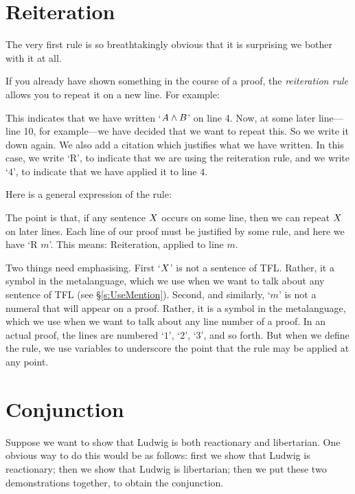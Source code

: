 \section{Reiteration}\label{s:Reiteration}
The very first rule is so breathtakingly obvious that it is surprising we bother with it at all. 

If you already have shown something in the course of a proof, the \emph{reiteration rule} allows you to repeat it on a new line. For example:
\begin{pf}
	\have[$\vdots$]{}{\vdots}
	 
\end{pf}
This indicates that we have written `$A \wedge B$' on line 4. Now, at some later line---line 10, for example---we have decided that we want to repeat this. So we write it down again. We also add a citation which justifies what we have written. In this case, we write `R', to indicate that we are using the reiteration rule, and we write `$4$', to indicate that we have applied it to line $4$.

Here is a general expression of the rule:
\begin{pf}
	 
\end{pf}
The point is that, if any sentence $X$ occurs on some line, then we can repeat $X$ on later lines. Each line of our proof must be justified by some rule, and here we have `R $m$'. This means: Reiteration, applied to line $m$. 

Two things need emphasising. First `$X$' is not a sentence of TFL. Rather, it a symbol in the metalanguage, which we use when we want to talk about any sentence of TFL (see \S\ref{s:UseMention}). Second, and similarly, `$m$' is not a numeral that will appear on a proof. Rather, it is a symbol in the metalanguage, which we use when we want to talk about any line number of a proof. In an actual proof, the lines are numbered `$1$', `$2$', `$3$', and so forth. But when we define the rule, we use variables to underscore the point that the rule may be applied at any point.

\section{Conjunction}
Suppose we want to show that Ludwig is both reactionary and libertarian. One obvious way to do this would be as follows: first we show that Ludwig is reactionary; then we show that Ludwig is libertarian; then we put these two demonstrations together, to obtain the conjunction.

